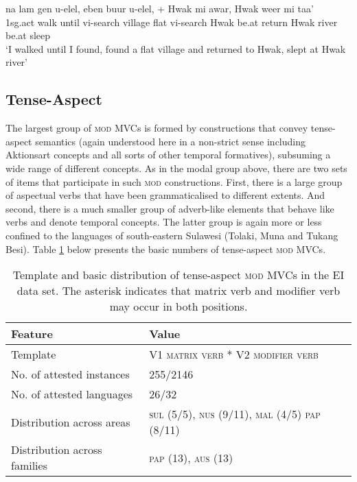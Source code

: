 \ea \label{Klon_99b}
\gll na lam gen u-elel, eben buur u-elel, + Hwak mi awar, Hwak weer mi taa' \\
1\acs{sg}.\acs{act} walk until \acs{vi}-search village flat \acs{vi}-search Hwak be.at return Hwak river be.at sleep \\
\glft `I walked until I found, found a flat village and returned to Hwak, slept at Hwak river' \\ 
\z
\xe

\subsection{Tense-Aspect}

The largest group of \textsc{mod} MVCs is formed by constructions that convey tense-aspect semantics (again understood here in a non-strict sense including Aktionsart concepts and all sorts of other temporal formatives), subsuming a wide range of different concepts. As in the modal group above, there are two sets of items that participate in such \textsc{mod} constructions. First, there is a large group of aspectual verbs that have been grammaticalised to different extents. And second, there is a much smaller group of adverb-like elements that behave like verbs and denote temporal concepts. The latter group is again more or less confined to the languages of south-eastern Sulawesi (Tolaki, Muna and Tukang Besi). Table \ref{table:tense-aspect} below presents the basic numbers of tense-aspect \textsc{mod} MVCs.

\begin{table}


\begin{tabular}{ll}
\lsptoprule
Feature&Value\tabularnewline
\hline
Template&V1 \textsc{matrix verb} * V2 \textsc{modifier verb}\tabularnewline
No. of attested instances& 255/2146 \tabularnewline
No. of attested languages& 26/32 \tabularnewline
Distribution across areas& \textsc{sul} (5/5), \textsc{nus} (9/11), \textsc{mal} (4/5) \textsc{pap} (8/11) \tabularnewline
Distribution across families& \textsc{pap} (13), \textsc{aus} (13) \tabularnewline
\hline
\end{tabular}
\caption[Template and basic distribution of tense-aspect \textsc{mod} MVCs]{Template and basic distribution of tense-aspect \textsc{mod} MVCs in the EI data set. The asterisk indicates that matrix verb and modifier verb may occur in both positions.}
\label{table:tense-aspect}
\end{table}


